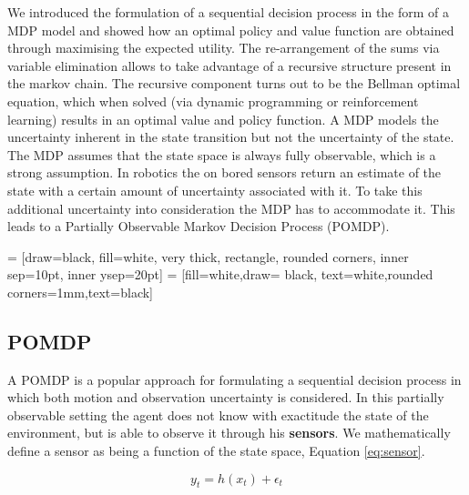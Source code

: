 We introduced the formulation of a sequential decision process in the form of a MDP model and showed how an optimal policy 
and value function are obtained through maximising the expected utility. The re-arrangement of the sums via
variable elimination allows to take advantage of a recursive structure present in the markov chain. The recursive component 
turns out to be the Bellman optimal equation, which when solved (via dynamic programming or reinforcement learning) results 
in an optimal value and policy function. A MDP models the uncertainty inherent in the state transition but not the uncertainty 
of the state. The MDP assumes that the state space is always fully observable, which is a strong assumption. In robotics the 
on bored sensors return an estimate of the state with a certain amount of uncertainty associated with it. To take this additional
uncertainty into consideration the MDP has to accommodate it. This leads to a Partially Observable Markov Decision Process (POMDP).





  = [draw=black, fill=white, very thick,  rectangle, rounded corners, inner sep=10pt, inner ysep=20pt]
 = [fill=white,draw= black, text=white,rounded corners=1mm,text=black]


\subsection{POMDP}

A POMDP is a popular approach for formulating a sequential decision process in which both motion and observation 
uncertainty is considered. In this partially observable setting the agent does not know with exactitude the state of the environment,
but is able to observe it through his \textbf{sensors}. We mathematically define a sensor as being a function of the 
state space, Equation \ref{eq:sensor}.

\begin{equation}\label{eq:sensor}
  y_t = h(x_t) + \epsilon_t
\end{equation}

